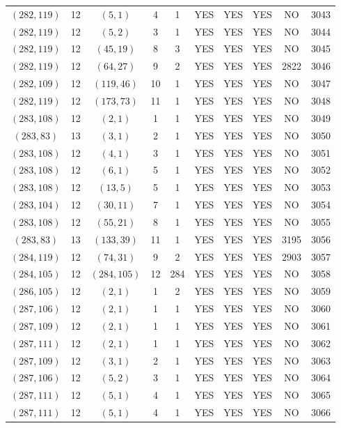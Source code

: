 \begin{longtable}{|c|c|c|c|c|c|c|c|c|c|}
$(282, 119)$ & 12 & $(5, 1)$ & 4 & 1 & YES & YES & YES & NO & 3043\\
$(282, 119)$ & 12 & $(5, 2)$ & 3 & 1 & YES & YES & YES & NO & 3044\\
$(282, 119)$ & 12 & $(45, 19)$ & 8 & 3 & YES & YES & YES & NO & 3045\\
$(282, 119)$ & 12 & $(64, 27)$ & 9 & 2 & YES & YES & YES & 2822 & 3046\\
$(282, 109)$ & 12 & $(119, 46)$ & 10 & 1 & YES & YES & YES & NO & 3047\\
$(282, 119)$ & 12 & $(173, 73)$ & 11 & 1 & YES & YES & YES & NO & 3048\\
$(283, 108)$ & 12 & $(2, 1)$ & 1 & 1 & YES & YES & YES & NO & 3049\\
$(283, 83)$ & 13 & $(3, 1)$ & 2 & 1 & YES & YES & YES & NO & 3050\\
$(283, 108)$ & 12 & $(4, 1)$ & 3 & 1 & YES & YES & YES & NO & 3051\\
$(283, 108)$ & 12 & $(6, 1)$ & 5 & 1 & YES & YES & YES & NO & 3052\\
$(283, 108)$ & 12 & $(13, 5)$ & 5 & 1 & YES & YES & YES & NO & 3053\\
$(283, 104)$ & 12 & $(30, 11)$ & 7 & 1 & YES & YES & YES & NO & 3054\\
$(283, 108)$ & 12 & $(55, 21)$ & 8 & 1 & YES & YES & YES & NO & 3055\\
$(283, 83)$ & 13 & $(133, 39)$ & 11 & 1 & YES & YES & YES & 3195 & 3056\\
$(284, 119)$ & 12 & $(74, 31)$ & 9 & 2 & YES & YES & YES & 2903 & 3057\\
$(284, 105)$ & 12 & $(284, 105)$ & 12 & 284 & YES & YES & YES & NO & 3058\\
$(286, 105)$ & 12 & $(2, 1)$ & 1 & 2 & YES & YES & YES & NO & 3059\\
$(287, 106)$ & 12 & $(2, 1)$ & 1 & 1 & YES & YES & YES & NO & 3060\\
$(287, 109)$ & 12 & $(2, 1)$ & 1 & 1 & YES & YES & YES & NO & 3061\\
$(287, 111)$ & 12 & $(2, 1)$ & 1 & 1 & YES & YES & YES & NO & 3062\\
$(287, 109)$ & 12 & $(3, 1)$ & 2 & 1 & YES & YES & YES & NO & 3063\\
$(287, 106)$ & 12 & $(5, 2)$ & 3 & 1 & YES & YES & YES & NO & 3064\\
$(287, 111)$ & 12 & $(5, 1)$ & 4 & 1 & YES & YES & YES & NO & 3065\\
$(287, 111)$ & 12 & $(5, 1)$ & 4 & 1 & YES & YES & YES & NO & 3066\\

\end{longtable}
